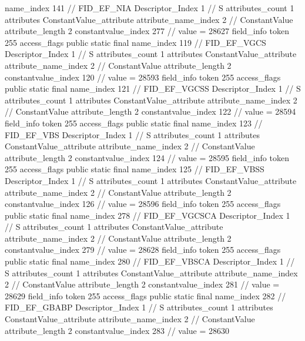 {{{{{				name_index	141		// FID_EF_NIA
				Descriptor_Index	1		// S
				attributes_count	1
				attributes {
				ConstantValue_attribute {
					attribute_name_index	2		// ConstantValue
					attribute_length	2
					constantvalue_index	277		// value = 28627
				}
				}
			}
			field_info {
				token	255
				access_flags	public static final
				name_index	119		// FID_EF_VGCS
				Descriptor_Index	1		// S
				attributes_count	1
				attributes {
				ConstantValue_attribute {
					attribute_name_index	2		// ConstantValue
					attribute_length	2
					constantvalue_index	120		// value = 28593
				}
				}
			}
			field_info {
				token	255
				access_flags	public static final
				name_index	121		// FID_EF_VGCSS
				Descriptor_Index	1		// S
				attributes_count	1
				attributes {
				ConstantValue_attribute {
					attribute_name_index	2		// ConstantValue
					attribute_length	2
					constantvalue_index	122		// value = 28594
				}
				}
			}
			field_info {
				token	255
				access_flags	public static final
				name_index	123		// FID_EF_VBS
				Descriptor_Index	1		// S
				attributes_count	1
				attributes {
				ConstantValue_attribute {
					attribute_name_index	2		// ConstantValue
					attribute_length	2
					constantvalue_index	124		// value = 28595
				}
				}
			}
			field_info {
				token	255
				access_flags	public static final
				name_index	125		// FID_EF_VBSS
				Descriptor_Index	1		// S
				attributes_count	1
				attributes {
				ConstantValue_attribute {
					attribute_name_index	2		// ConstantValue
					attribute_length	2
					constantvalue_index	126		// value = 28596
				}
				}
			}
			field_info {
				token	255
				access_flags	public static final
				name_index	278		// FID_EF_VGCSCA
				Descriptor_Index	1		// S
				attributes_count	1
				attributes {
				ConstantValue_attribute {
					attribute_name_index	2		// ConstantValue
					attribute_length	2
					constantvalue_index	279		// value = 28628
				}
				}
			}
			field_info {
				token	255
				access_flags	public static final
				name_index	280		// FID_EF_VBSCA
				Descriptor_Index	1		// S
				attributes_count	1
				attributes {
				ConstantValue_attribute {
					attribute_name_index	2		// ConstantValue
					attribute_length	2
					constantvalue_index	281		// value = 28629
				}
				}
			}
			field_info {
				token	255
				access_flags	public static final
				name_index	282		// FID_EF_GBABP
				Descriptor_Index	1		// S
				attributes_count	1
				attributes {
				ConstantValue_attribute {
					attribute_name_index	2		// ConstantValue
					attribute_length	2
					constantvalue_index	283		// value = 28630
				}
}}}}}}
